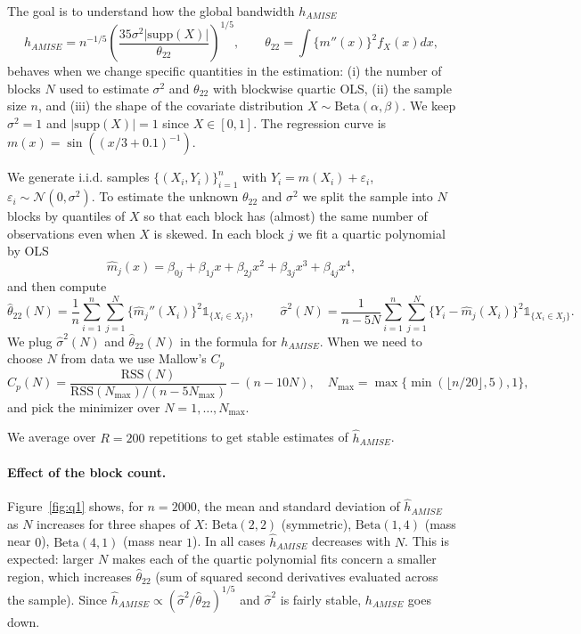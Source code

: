 \documentclass[11pt]{article}
\begin{document}
The goal is to understand how the global bandwidth \(h_{AMISE}\)
\[
h_{AMISE}=n^{-1/5}\left(\frac{35\sigma^2|\mathrm{supp}(X)|}{\theta_{22}}\right)^{1/5},
\qquad 
\theta_{22}=\int \{m''(x)\}^2 f_X(x)dx,
\]
behaves when we change specific quantities in the estimation:
(i) the number of blocks \(N\) used to estimate \(\sigma^2\) and \(\theta_{22}\) with blockwise quartic OLS,
(ii) the sample size \(n\),
and (iii) the shape of the covariate distribution \(X\sim\mathrm{Beta}(\alpha,\beta)\).
We keep \(\sigma^2=1\) and \(|\mathrm{supp}(X)|=1\) since \(X\in[0,1]\).
The regression curve is \(m(x)=\sin((x/3+0.1)^{-1})\).


We generate i.i.d. samples \(\{(X_i,Y_i)\}_{i=1}^n\) with \(Y_i=m(X_i)+\varepsilon_i\), \(\varepsilon_i\sim\mathcal N(0,\sigma^2)\).
To estimate the unknown \(\theta_{22}\) and \(\sigma^2\) we split the sample into \(N\) blocks by quantiles of \(X\) so that each block has (almost) the same number of observations even when \(X\) is skewed. In each block \(j\) we fit a quartic polynomial by OLS
\[
\hat m_j(x)=\beta_{0j}+\beta_{1j}x+\beta_{2j}x^2+\beta_{3j}x^3+\beta_{4j}x^4,
\]
and then compute
\[
\hat{\theta}_{22}(N)=\frac{1}{n}\sum_{i=1}^n\sum_{j=1}^N \{\hat m_j''(X_i)\}^2 \mathbb{1}_{\{X_i\in X_j\}},\qquad
\hat\sigma^2(N)=\frac{1}{n-5N}\sum_{i=1}^n\sum_{j=1}^N \{Y_i-\hat m_j(X_i)\}^2 \mathbb{1}_{\{X_i\in X_j\}}.
\]
We plug \(\hat\sigma^2(N)\) and \(\hat\theta_{22}(N)\) in the formula for \(h_{AMISE}\).
When we need to choose \(N\) from data we use Mallow's \(C_p\)
\[
C_p(N)=\frac{\mathrm{RSS}(N)}{\mathrm{RSS}(N_{\max})/(n-5N_{\max})}-(n-10N),
\quad N_{\max}=\max\{\min(\lfloor n/20\rfloor,5),1\},
\]
and pick the minimizer over \(N=1,\dots,N_{\max}\).

We average over \(R=200\) repetitions to get stable estimates of \(\hat h_{AMISE}\).


\paragraph{Effect of the block count.}
Figure~\ref{fig:q1} shows, for \(n=2000\), the mean and standard deviation of \(\hat h_{AMISE}\) as \(N\) increases for three shapes of \(X\): \(\mathrm{Beta}(2,2)\) (symmetric), \(\mathrm{Beta}(1,4)\) (mass near \(0\)), \(\mathrm{Beta}(4,1)\) (mass near \(1\)).
In all cases \(\hat h_{AMISE}\) decreases with \(N\).
This is expected: larger \(N\) makes each of the quartic polynomial fits concern a smaller region, which increases \(\hat{\theta}_{22}\) (sum of squared second derivatives evaluated across the sample).
Since \(\hat h_{AMISE}\propto(\hat\sigma^2/\hat\theta_{22})^{1/5}\) and \(\hat\sigma^2\) is fairly stable, \(h_{AMISE}\) goes down.
\end{document}
